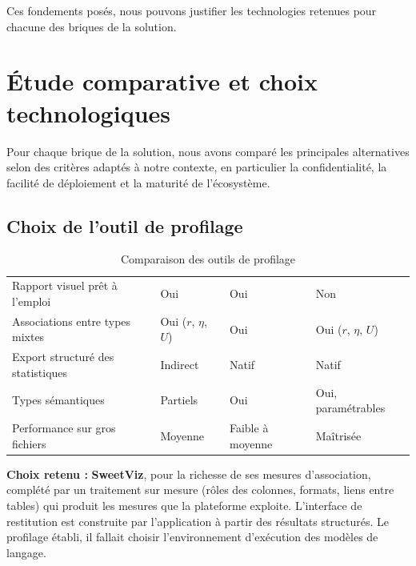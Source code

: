 Ces fondements posés, nous pouvons justifier les technologies retenues pour chacune des briques de la solution.

\section{Étude comparative et choix technologiques}

Pour chaque brique de la solution, nous avons comparé les principales alternatives selon des critères adaptés à notre contexte, en particulier la confidentialité, la facilité de déploiement et la maturité de l'écosystème.

\subsection{Choix de l'outil de profilage}

\begin{table}[H]
\centering
\small
\begin{tabular}{|L{3.8cm}|L{3.2cm}|L{3.2cm}|L{3.4cm}|}
\hline
{} &  &  &  \\ \hline
Rapport visuel prêt à l'emploi & Oui & Oui & Non \\ \hline
Associations entre types mixtes & Oui ($r$, $\eta$, $U$) & Oui & Oui ($r$, $\eta$, $U$) \\ \hline
Export structuré des statistiques & Indirect & Natif & Natif \\ \hline
Types sémantiques & Partiels & Oui & Oui, paramétrables \\ \hline
Performance sur gros fichiers & Moyenne & Faible à moyenne & Maîtrisée \\ \hline
\end{tabular}
\caption{Comparaison des outils de profilage}
\label{tab:cmp-profiling}
\end{table}

\noindent\textbf{Choix retenu :} \textbf{SweetViz}, pour la richesse de ses mesures d'association, complété par un traitement sur mesure (rôles des colonnes, formats, liens entre tables) qui produit les mesures que la plateforme exploite. L'interface de restitution est construite par l'application à partir des résultats structurés. Le profilage établi, il fallait choisir l'environnement d'exécution des modèles de langage.

